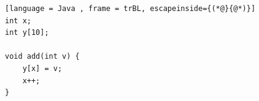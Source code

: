 \begin{lstlisting}[language = Java , frame = trBL, escapeinside={(*@}{@*)}]
int x;
int y[10];

void add(int v) {
    y[x] = v;
    x++;
}
\end{lstlisting}
